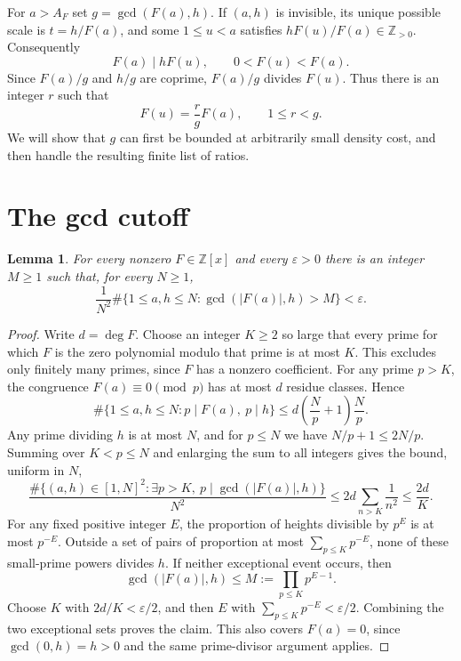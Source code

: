 \documentclass[10pt]{article}
\newtheorem{lemma}[theorem]{Lemma}
\newcommand{\Z}{\mathbb Z}
\begin{document}
For $a>A_F$ set $g=\gcd(F(a),h)$. If $(a,h)$ is invisible, its unique
possible scale is $t=h/F(a)$, and some $1\le u<a$ satisfies
$hF(u)/F(a)\in\Z_{>0}$. Consequently
\[
 F(a)\mid hF(u),\qquad 0<F(u)<F(a).
\]
Since $F(a)/g$ and $h/g$ are coprime, $F(a)/g$ divides $F(u)$.
Thus there is an integer $r$ such that
\begin{equation}\label{eq:finite-ratio}
                  F(u)=\frac r g F(a),\qquad 1\le r<g.
\end{equation}
We will show that $g$ can first be bounded at arbitrarily small density
cost, and then handle the resulting finite list of ratios.

\section{The gcd cutoff}
\begin{lemma}\label{lem:tight}
For every nonzero $F\in\Z[x]$ and every $\varepsilon>0$ there is an
integer $M\ge1$ such that, for every $N\ge1$,
\[
 \frac1{N^2}
 \#\{1\le a,h\le N:\gcd(|F(a)|,h)>M\}<\varepsilon.
\]
\end{lemma}
\begin{proof}
Write $d=\deg F$. Choose an integer $K\ge2$ so large that every prime
for which $F$ is the zero polynomial modulo that prime is at most $K$.
This excludes only finitely many primes, since $F$ has a nonzero
coefficient. For any prime $p>K$, the congruence $F(a)\equiv0\pmod p$
has at most $d$ residue classes. Hence
\[
 \#\{1\le a,h\le N:p\mid F(a),\ p\mid h\}
 \le d\left(\frac Np+1\right)\frac Np.
\]
Any prime dividing $h$ is at most $N$, and for $p\le N$ we have
$N/p+1\le2N/p$. Summing over $K<p\le N$ and enlarging the sum to
all integers gives the bound, uniform in $N$,
\begin{equation}\label{eq:large-primes}
 \frac{\#\{(a,h)\in[1,N]^2:\exists p>K,\ p\mid\gcd(|F(a)|,h)\}}{N^2}
 \le 2d\sum_{n>K}\frac1{n^2}\le\frac{2d}{K}.
\end{equation}
For any fixed positive integer $E$, the proportion of heights divisible
by $p^E$ is at most $p^{-E}$. Outside a set of pairs of proportion at most
$\sum_{p\le K}p^{-E}$, none of these small-prime powers divides $h$.
If neither exceptional event occurs, then
\[
       \gcd(|F(a)|,h)\le M:=\prod_{p\le K}p^{E-1}.
\]
Choose $K$ with $2d/K<\varepsilon/2$, and then $E$ with
$\sum_{p\le K}p^{-E}<\varepsilon/2$. Combining the two exceptional
sets proves the claim. This also covers $F(a)=0$,
since $\gcd(0,h)=h>0$ and the same prime-divisor argument applies.
\end{proof}
\end{document}
